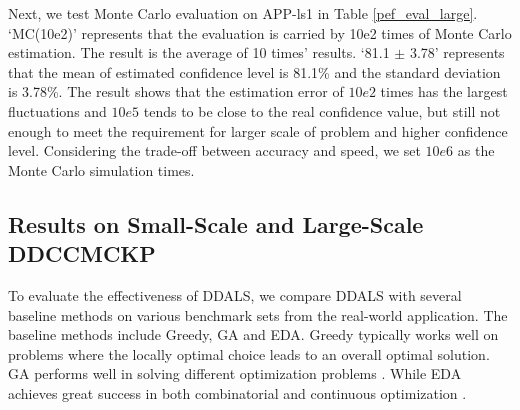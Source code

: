 \documentclass[lettersize,journal]{IEEEtran}
\begin{document}
\begin{table}[!t]
\caption{Evaluation for APP-ls1}
\centering
{}
\label{pef_eval_large}
\end{table}

Next, we test Monte Carlo evaluation on APP-ls1 in Table \ref{pef_eval_large}. 
`MC(10e2)' represents that the evaluation is carried by 10e2 times of Monte Carlo estimation. 
The result is the average of 10 times' results. 
`81.1 $\pm$ 3.78' represents that the mean of estimated confidence level is 81.1\% and the standard deviation is 3.78\%. 
The result shows that the estimation error of $10e2$ times has the largest fluctuations and $10e5$ tends to be close to the real confidence value, but still not enough to meet the requirement for larger scale of problem and higher confidence level. 
Considering the trade-off between accuracy and speed, we set $10e6$ as the Monte Carlo simulation times.

\subsection{Results on Small-Scale and Large-Scale DDCCMCKP}
To evaluate the effectiveness of DDALS, we compare DDALS with several baseline methods on various benchmark sets from the real-world application. 
The baseline methods include Greedy, GA and EDA. 
Greedy typically works well on problems where the locally optimal choice leads to an overall optimal solution.
GA performs well in solving different optimization problems \cite{9075201}.
While EDA achieves great success in both combinatorial and continuous optimization \cite{6899662}. 
\end{document}
